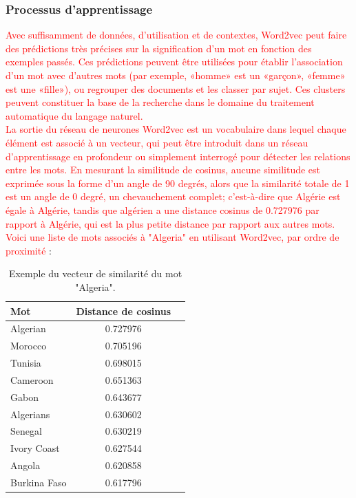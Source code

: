     \subsubsection{Processus d'apprentissage}
    
     \textcolor{red}{Avec suffisamment de données, d'utilisation et de contextes, Word2vec peut faire des prédictions très précises sur la signification d'un mot en fonction des exemples passés. Ces prédictions peuvent être utilisées pour établir l'association d'un mot avec d'autres mots (par exemple, «homme» est un «garçon», «femme» est une «fille»), ou regrouper des documents et les classer par sujet. Ces clusters peuvent constituer la base de la recherche dans le domaine du traitement automatique du langage naturel.\\ 
    La sortie du réseau de neurones Word2vec est un vocabulaire dans lequel chaque élément est associé à un vecteur, qui peut être introduit dans un réseau d'apprentissage en profondeur ou simplement interrogé pour détecter les relations entre les mots. En mesurant la similitude de cosinus, aucune similitude est exprimée sous la forme d'un angle de 90 degrés, alors que la similarité totale de 1 est un angle de 0 degré, un chevauchement complet; c'est-à-dire que Algérie est égale à Algérie, tandis que algérien a une distance cosinus de 0.727976 par rapport à Algérie, qui est la plus petite distance par rapport aux autres mots. Voici une liste de mots associés à "Algeria" en utilisant Word2vec, par ordre de proximité }:
    
    \begin{table}[h!]
    	\centering
                 \begin{tabular}{|l|c|r|}
                 	\hline
                 	Mot & Distance de cosinus\\
                 	\hline
                 	Algerian & 0.727976 \\
                    Morocco & 0.705196 \\
                    Tunisia & 0.698015 \\
                    Cameroon & 0.651363 \\
                    Gabon & 0.643677 \\ 
                    Algerians & 0.630602 \\
                    Senegal & 0.630219 \\
                    Ivory Coast & 0.627544 \\
                    Angola & 0.620858 \\
                    Burkina Faso & 0.617796 \\
                 	\hline
                 \end{tabular}
             \caption{Exemple du vecteur de similarité du mot "Algeria".}
             \label{table:1}
         \end{table}
             
